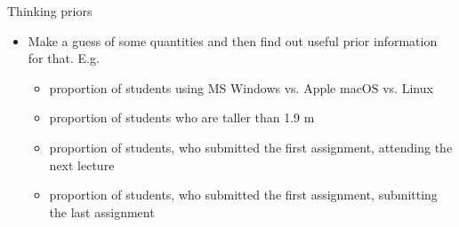 \documentclass[english,t]{beamer}
\begin{document}
\begin{frame}{Thinking priors}

  \begin{itemize}
  \item Make a guess of some quantities and then find out useful
    prior information for that. E.g.
    \begin{itemize}
    \item proportion of students using MS Windows vs. Apple macOS vs. Linux
    \item proportion of students who are taller than 1.9 m
    \item proportion of students, who submitted the first assignment,
      attending the next lecture
    \item proportion of students, who submitted the first assignment,
      submitting the last assignment
    \end{itemize}
  \end{itemize}
  
\end{frame}
\end{document}
